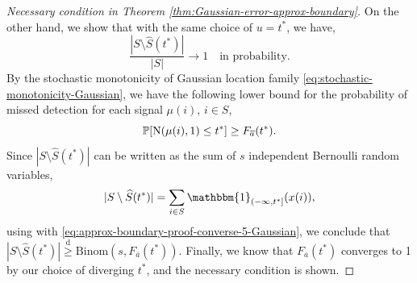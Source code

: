 \begin{proof}[Necessary condition in Theorem \ref{thm:Gaussian-error-approx-boundary}]
On the other hand, we show that with the same choice of $u = t^*$, we have,
\begin{equation} \label{eq:approx-boundary-proof-converse-4-Gaussian}
    \frac{|{S}\setminus\widehat{S}(t^*)|}{|{S}|}\to 1 \quad \text{in probability}.
\end{equation}
By the stochastic monotonicity of Gaussian location family \eqref{eq:stochastic-monotonicity-Gaussian}, we have the following lower bound for the probability of missed detection for each signal $\mu(i)$, $i\in S$, 
\begin{equation} \label{eq:approx-boundary-proof-converse-5-Gaussian}
    \P[\mathrm{N}(\mu(i), 1) \le t^*] \ge F_{\overline{a}}(t^*).
\end{equation}
Since $|{S}\setminus\widehat{S}(t^*)|$ can be written as the sum of $s$ independent Bernoulli random variables,
\begin{equation*}
    |{S}\setminus\widehat{S}(t^*)| = \sum_{i\in S} \mathbbm{1}_{(-\infty, t^*]}(x(i)),
\end{equation*}
using with \eqref{eq:approx-boundary-proof-converse-5-Gaussian}, we conclude that $|{S}\setminus\widehat{S}(t^*)| \stackrel{\mathrm{d}}{\ge} \text{Binom}(s, {F_{\overline{a}}}(t^*))$.
Finally, we know that ${F_{\overline{a}}}(t^*)$ converges to 1 by our choice of diverging $t^*$, and the necessary condition is shown.
\end{proof}


